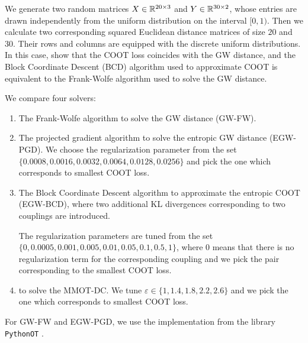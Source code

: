 We generate two random matrices $X \in \mathbb R^{20 \times 3}$ and $Y \in \mathbb R^{30 \times 2}$,
whose entries are drawn independently from the uniform distribution on the interval $[0,1)$. Then we calculate two corresponding
squared Euclidean distance matrices of size $20$ and $30$. Their rows and columns are equipped with the discrete
uniform distributions. In this case, \citep{Redko20} show that the COOT loss coincides with the GW distance, and the
Block Coordinate Descent (BCD) algorithm used to approximate COOT is equivalent to the Frank-Wolfe algorithm \citep{Frank56}
used to solve the GW distance.

We compare four solvers:
\begin{enumerate}
  \item The Frank-Wolfe algorithm to solve the GW distance (GW-FW).

  \item The projected gradient algorithm to solve the entropic GW distance \citep{Peyre16} (EGW-PGD).
  We choose the regularization parameter from the set
  $\{0.0008, 0.0016, 0.0032, 0.0064, 0.0128, 0.0256 \}$
  and pick the one which corresponds to smallest COOT loss.

  \item The Block Coordinate Descent algorithm to approximate the entropic COOT \citep{Redko20}
  (EGW-BCD), where two additional KL divergences corresponding to two couplings are introduced.

  The regularization parameters are tuned from the set
  $\{0, 0.0005, 0.001, 0.005, 0.01, 0.05, 0.1, 0.5, 1 \}$,
  where $0$ means that there is no regularization term for the corresponding coupling
  and we pick the pair corresponding to the smallest COOT loss.

  \item {} to solve the MMOT-DC. We tune
  $\varepsilon \in \{1, 1.4, 1.8, 2.2, 2.6\}$ and we pick the one which corresponds to smallest COOT loss.
\end{enumerate}
For GW-FW and EGW-PGD, we use the implementation from the library \texttt{PythonOT} \citep{Flamary21}.

